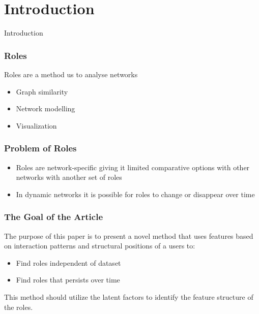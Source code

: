 \section{Introduction}

\begin{frame}
     \begin{center}
     	\huge Introduction
     \end{center}
\end{frame}

\begin{frame}
\frametitle{Roles}
Roles are a method us to analyse networks
\begin{itemize}
\item Graph similarity 
\item Network modelling 
\item Visualization 
\end{itemize}
\end{frame}

\begin{frame}
\frametitle{Problem of Roles}
\begin{itemize}
\item Roles are network-specific giving it limited comparative options with other networks with another set of roles
\item In dynamic networks it is possible for roles to change or disappear over time
\end{itemize}
\end{frame}

\begin{frame}
\frametitle{The Goal of the Article}
The purpose of this paper is to present a novel method that uses features based on interaction patterns and structural positions of a users to:
\begin{itemize}
\item Find roles independent of dataset
\item Find roles that persists over time
\end{itemize}
This method should utilize the latent factors to identify the feature structure of the roles.

\end{frame}





